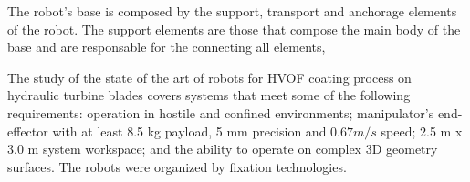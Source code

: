 The robot's base is composed by the support, transport and anchorage elements of
the robot. The support elements are those that compose the main body of the base
and are responsable for the connecting all elements, 




The study of the state of the art of robots for HVOF coating process on
hydraulic turbine blades covers systems that meet some of the following
requirements:
operation in hostile and confined environments; manipulator's end-effector with
at least 8.5 kg payload, 5 mm precision and $0.67 m/s$ speed; 2.5 m x 3.0 m
system workspace; and the ability to operate on complex 3D geometry surfaces.
The robots were organized by fixation technologies.



